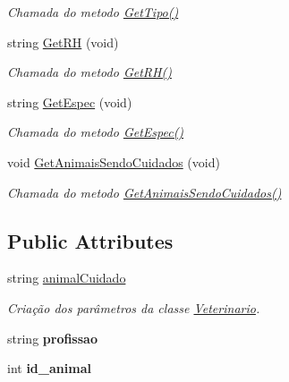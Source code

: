 \begin{DoxyCompactItemize}
\begin{DoxyCompactList}\small\item\em Chamada do metodo \mbox{\hyperlink{class_veterinario_aeb8048b01d42ac31784b4d58508c492f}{Get\+Tipo()}} \end{DoxyCompactList}\item 
\mbox{\label{class_veterinario_a00df6b65d60ccf1f95d984685e53196f}} 
string \mbox{\hyperlink{class_veterinario_a00df6b65d60ccf1f95d984685e53196f}{Get\+RH}} (void)
\begin{DoxyCompactList}\small\item\em Chamada do metodo \mbox{\hyperlink{class_veterinario_a00df6b65d60ccf1f95d984685e53196f}{Get\+R\+H()}} \end{DoxyCompactList}\item 
\mbox{\label{class_veterinario_aeae677cd50450abdcbb3736ac2764263}} 
string \mbox{\hyperlink{class_veterinario_aeae677cd50450abdcbb3736ac2764263}{Get\+Espec}} (void)
\begin{DoxyCompactList}\small\item\em Chamada do metodo \mbox{\hyperlink{class_veterinario_aeae677cd50450abdcbb3736ac2764263}{Get\+Espec()}} \end{DoxyCompactList}\item 
\mbox{\label{class_veterinario_a4d78963bea3ad8951d720571fec0de90}} 
void \mbox{\hyperlink{class_veterinario_a4d78963bea3ad8951d720571fec0de90}{Get\+Animais\+Sendo\+Cuidados}} (void)
\begin{DoxyCompactList}\small\item\em Chamada do metodo \mbox{\hyperlink{class_veterinario_a4d78963bea3ad8951d720571fec0de90}{Get\+Animais\+Sendo\+Cuidados()}} \end{DoxyCompactList}\end{DoxyCompactItemize}
\subsection*{Public Attributes}
\begin{DoxyCompactItemize}
\item 
string \mbox{\hyperlink{class_veterinario_aed8158858ac80a01397b657753a5a72d}{animal\+Cuidado}}
\begin{DoxyCompactList}\small\item\em Criação dos parâmetros da classe \mbox{\hyperlink{class_veterinario}{Veterinario}}. \end{DoxyCompactList}\item 
\mbox{\label{class_veterinario_a23febbfc3e0ef8426560ec9cfccbebdf}} 
string {\bfseries profissao}
\item 
\mbox{\label{class_veterinario_a24528fd39cf119689fec10159cc76233}} 
int {\bfseries id\+\_\+animal}
\end{DoxyCompactItemize}
